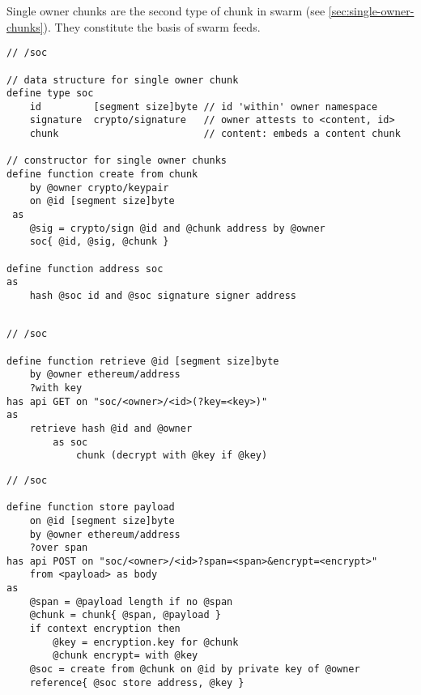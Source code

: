 Single owner chunks are the second type of chunk in swarm (see \ref{sec:single-owner-chunks}). They constitute the basis of swarm feeds.


\begin{definition}\label{def:soc}
\begin{lstlisting}[language=buzz1]
// /soc

// data structure for single owner chunk
define type soc 
    id         [segment size]byte // id 'within' owner namespace
    signature  crypto/signature   // owner attests to <content, id> 
    chunk                         // content: embeds a content chunk

// constructor for single owner chunks
define function create from chunk 
    by @owner crypto/keypair
    on @id [segment size]byte
 as
    @sig = crypto/sign @id and @chunk address by @owner
    soc{ @id, @sig, @chunk }

define function address soc
as
    hash @soc id and @soc signature signer address
    
\end{lstlisting}
\end{definition}

\begin{definition}\label{def:soc-retrieve}
\begin{lstlisting}[language=buzz1]
// /soc

define function retrieve @id [segment size]byte
    by @owner ethereum/address
    ?with key
has api GET on "soc/<owner>/<id>(?key=<key>)"
as
    retrieve hash @id and @owner 
        as soc
            chunk (decrypt with @key if @key)
\end{lstlisting}
\end{definition}


\begin{definition}\label{def:soc-store}
\begin{lstlisting}[language=buzz1]
// /soc

define function store payload
    on @id [segment size]byte
    by @owner ethereum/address 
    ?over span
has api POST on "soc/<owner>/<id>?span=<span>&encrypt=<encrypt>"
    from <payload> as body
as 
    @span = @payload length if no @span
    @chunk = chunk{ @span, @payload }
    if context encryption then
        @key = encryption.key for @chunk 
        @chunk encrypt= with @key
    @soc = create from @chunk on @id by private key of @owner
    reference{ @soc store address, @key }
             
\end{lstlisting}
\end{definition}
